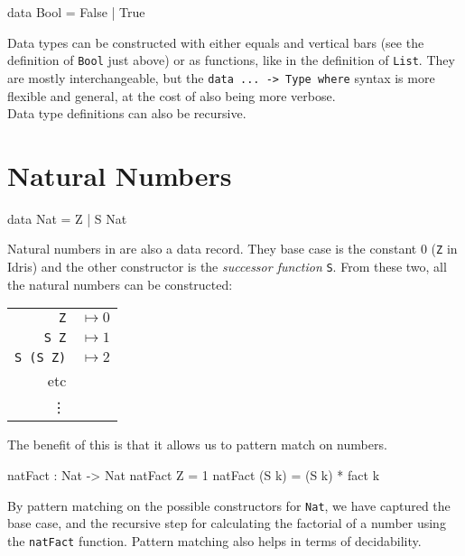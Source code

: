     \begin{code}[caption={\texttt{Bool} as defined in the \Idris prelude}]
        data Bool = False
                  | True
    \end{code}
    Data types can be constructed with either equals and vertical bars (see the definition of \texttt{Bool} just above) or as functions, like in the definition of \texttt{List}. They are mostly interchangeable, but the \texttt{data ... -> Type where} syntax is more flexible and general, at the cost of also being more verbose.
    \\
    
    Data type definitions can also be recursive.


\section{Natural Numbers}\label{des:nats}
    \begin{code}[caption={Natural numbers as defined in the \Idris prelude}]
        data Nat = Z | S Nat
    \end{code}

    Natural numbers in \Idris are also a data record. They base case is the constant 0 (\texttt{Z} in Idris) and the other constructor is the \textit{successor function} \texttt{S}. From these two, all the natural numbers can be constructed:
    
    \begin{tabular}{r l}
        \texttt{Z} & $\mapsto 0$ \\ 
        \texttt{S Z} & $\mapsto 1$ \\ 
        \texttt{S (S Z)} & $\mapsto 2$ \\
        etc & \\
        \vdots & \\
    \end{tabular}
    \par
    The benefit of this is that it allows us to pattern match on numbers.
    
    \begin{code}[caption={Pattern matching on \texttt{Nat}s}]
        natFact : Nat -> Nat
        natFact Z = 1
        natFact (S k) = (S k) * fact k
    \end{code}
    By pattern matching on the possible constructors for \texttt{Nat}, we have captured the base case, and the recursive step for calculating the factorial of a number using the \texttt{natFact} function.
    Pattern matching also helps in terms of decidability.
    \\


